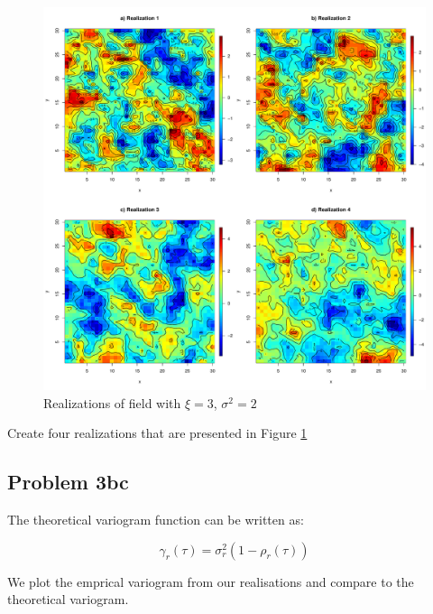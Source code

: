 \documentclass[]{article}
\begin{document}
\begin{figure}

{\centering \includegraphics{Exercise_1_files/figure-latex/fig3a1-1} 

}

\caption{\label{fig:fig3a1} Realizations of field with $\xi = 3$, $\sigma^2 = 2$}\label{fig:fig3a1}
\end{figure}

Create four realizations that are presented in Figure \ref{fig:fig3a1}

\subsection{Problem 3bc}\label{problem-3bc}

The theoretical variogram function can be written as:

\begin{equation}
    \gamma_r(\tau) =  \sigma_r^2(1-\rho_r(\tau))
\end{equation}

We plot the emprical variogram from our realisations and compare to the
theoretical variogram.
\end{document}
